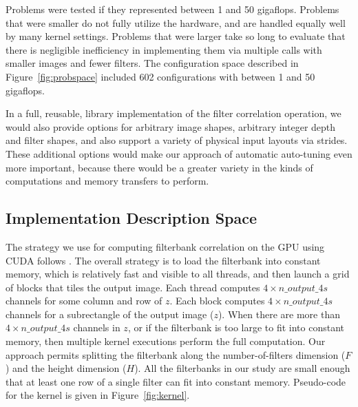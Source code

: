\documentclass{sig-alternate}
\begin{document}

Problems were tested if they represented between 1 and 50 gigaflops.  Problems
that were smaller do not fully utilize the hardware, and are handled equally
well by many kernel settings.
Problems that were larger take so long to evaluate that there is negligible
inefficiency in implementing them via multiple calls with smaller images and fewer filters.
The configuration space described in Figure~\ref{fig:probspace} included 602
configurations with between 1 and 50 gigaflops.

In a full, reusable, library implementation of the filter correlation
operation, we would also provide options for arbitrary image shapes,
arbitrary integer depth and filter shapes, and also support a variety of
physical input layouts via strides.  These additional options would make our
approach of automatic auto-tuning even more important, because there would be
a greater variety in the kinds of computations and memory transfers to
perform.


\subsection{Implementation Description Space}

The strategy we use for computing filterbank correlation on the GPU
using CUDA follows \citet{pinto+cox:2011gcg}.
The overall strategy is to load the filterbank into constant memory, which is
relatively fast and visible to all threads, and then launch a grid of blocks
that tiles the output image.
Each thread computes $4 \times n\_output\_4s$ channels for some column and row of $z$.
Each block computes $4 \times n\_output\_4s$ channels for a subrectangle of the output image ($z$).
When there are more than $4 \times n\_output\_4s$ channels in $z$, or if the
filterbank is too large to fit into constant memory, then multiple
kernel executions perform the full computation.
Our approach permits splitting the filterbank along
the number-of-filters dimension ($F$) and the height dimension ($H$).
All the filterbanks in our study are small enough that
at least one row of a single filter can fit into constant memory.
Pseudo-code for the kernel is given in Figure~\ref{fig:kernel}.
\end{document}
